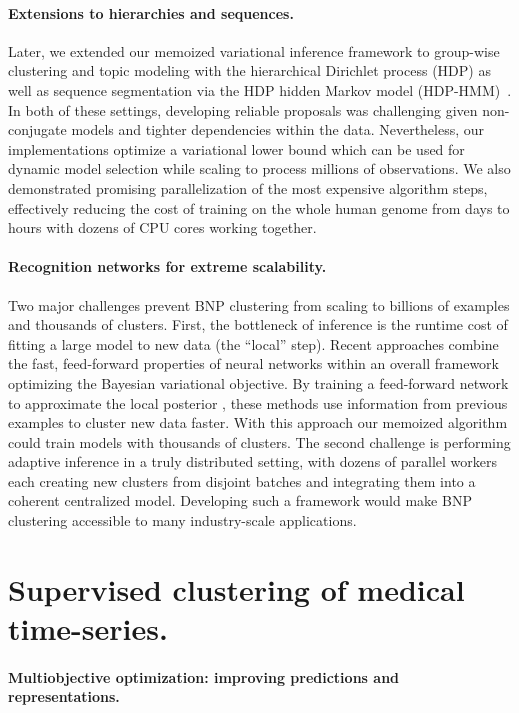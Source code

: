 \documentclass[11pt,letterpaper,sans]{article}
\begin{document}
\paragraph{Extensions to hierarchies and sequences.}
Later, we extended our memoized variational inference framework to group-wise clustering and topic modeling with the hierarchical Dirichlet process (HDP) \citep{hughes:hdpreliable} as well as sequence segmentation via the HDP hidden Markov model (HDP-HMM)~\citep{hughes:hdphmm}. In both of these settings, developing reliable proposals was challenging given non-conjugate models and tighter dependencies within the data. Nevertheless, our implementations optimize a variational lower bound which can be used for dynamic model selection while scaling to process millions of observations. We also demonstrated promising parallelization of the most expensive algorithm steps, effectively reducing the cost of training on the whole human genome from days to hours with dozens of CPU cores working together.

\paragraph{Recognition networks for extreme scalability.}
Two major challenges prevent BNP clustering from scaling to billions of examples and thousands of clusters. First, the bottleneck of inference is the runtime cost of fitting a large model to new data (the ``local'' step). Recent approaches  \cite{mnih:neuralVariational} combine the fast, feed-forward properties of neural networks within an overall framework optimizing the Bayesian variational objective. By training a feed-forward network to approximate the local posterior \cite{gan:deepTSBN}, these methods use information from previous examples to cluster new data faster. With this approach our memoized algorithm could train models with thousands of clusters. The second challenge is performing adaptive inference in a truly distributed setting, with dozens of parallel workers each creating new clusters from disjoint batches and integrating them into a coherent centralized model. Developing such a framework would make BNP clustering accessible to many industry-scale applications.


\section{Supervised clustering of medical time-series.}

\paragraph{Multiobjective optimization: improving predictions and representations.}
\end{document}
